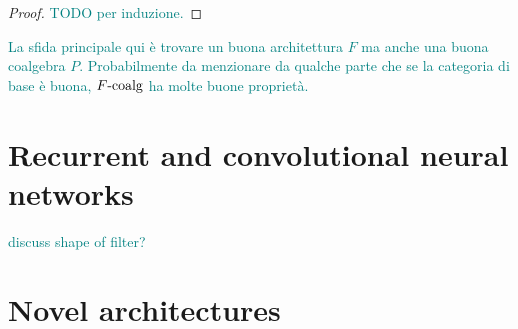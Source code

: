 \documentclass[12pt]{article}
\newcommand{\pietro}[1]{\textcolor{teal}{#1}}
\newcommand{\FCoalg}{{F\textnormal{-coalg}}}
\begin{document}
\begin{proof}
    \pietro{TODO per induzione.}
\end{proof}

\pietro{La sfida principale qui è trovare un buona architettura $F$ ma anche una buona coalgebra $P$. Probabilmente da menzionare da qualche parte che se la categoria di base è buona, $\FCoalg$ ha molte buone proprietà.}

\section{Recurrent and convolutional neural networks}

\pietro{discuss shape of filter?}

\section{Novel architectures}



\end{document}
